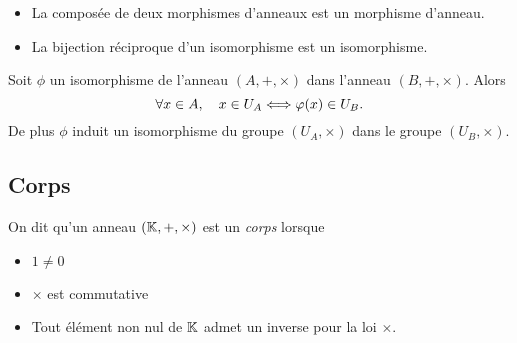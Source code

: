 \documentclass{magnolia}
\begin{document}

\begin{proposition}
\begin{itemize}
\item La composée de deux morphismes d'anneaux est un morphisme d'anneau.
\item La bijection réciproque d'un isomorphisme est un isomorphisme.
\end{itemize}
\end{proposition}

\begin{proposition}
Soit $\phi$ un isomorphisme de l'anneau $(A,+,\times)$ dans l'anneau $(B,+,\times)$. Alors
\[\forall x\in A,\quad x\in U_A \Longleftrightarrow \varphi(x)\in U_B.\]
De plus $\phi$ induit un isomorphisme du groupe $(U_A,\times)$ dans le groupe $(U_B,\times)$.
\end{proposition}

\subsection{Corps}

\begin{definition}
On dit qu'un anneau $\left(\mathbb{K},+,\times\right)$ est un \emph{corps} lorsque
\begin{itemize}
\item $1\neq 0$
\item $\times$ est commutative
\item Tout élément non nul de $\mathbb{K}$ admet un inverse pour la loi $\times$.
\end{itemize}
\end{definition}
\end{document}
